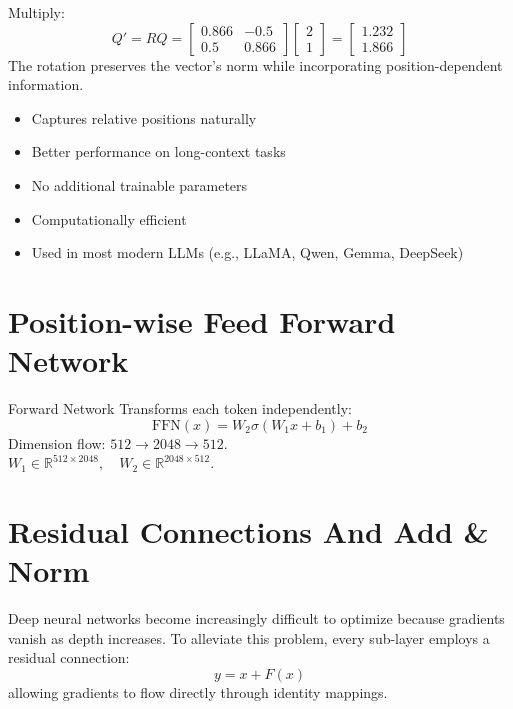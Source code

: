 Multiply:
\begin{equation}
Q' = R Q = \begin{bmatrix} 0.866 & -0.5 \\ 0.5 & 0.866 \end{bmatrix} \begin{bmatrix} 2 \\ 1 \end{bmatrix} = \begin{bmatrix} 1.232 \\ 1.866 \end{bmatrix}
\end{equation}
The rotation preserves the vector's norm while incorporating position-dependent information.

\begin{advbox}
\begin{itemize}
    \item Captures relative positions naturally
    \item Better performance on long-context tasks
    \item No additional trainable parameters
    \item Computationally efficient
    \item Used in most modern LLMs (e.g., LLaMA, Qwen, Gemma, DeepSeek)
\end{itemize}
\end{advbox}

\section{Position-wise Feed Forward Network}
Forward Network Transforms each token independently:
\begin{equation}
\text{FFN}(x) = W_2 \sigma(W_1 x + b_1) + b_2
\end{equation}
Dimension flow: $512 \to 2048 \to 512$. \\
$W_1 \in \mathbb{R}^{512 \times 2048}, \quad W_2 \in \mathbb{R}^{2048 \times 512}$.

\section{Residual Connections And Add \& Norm}
Deep neural networks become increasingly difficult to optimize because gradients vanish as depth increases. To alleviate this problem, every sub-layer employs a residual connection:
\begin{equation}
y = x + F(x)
\end{equation}
allowing gradients to flow directly through identity mappings.

